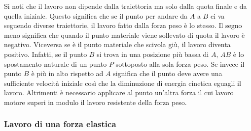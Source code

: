 \documentclass[10pt,a4paper]{book}
\begin{document}
\begin{figure}[htpb]
\end{figure}
\FloatBarrier
Si noti che il lavoro non dipende dalla traiettoria ma solo dalla quota finale e da quella iniziale. Questo significa che se il punto per andare da $A$ a $B$ ci va seguendo diverse traiettorie, il lavoro fatto dalla forza peso è lo stesso. Il segno meno significa che quando il punto materiale viene sollevato di quota il lavoro è negativo. Viceversa se è il punto materiale che scivola giù, il lavoro diventa positivo. Infatti, se il punto $B$ si trova in una posizione più bassa di $A$, $AB$ è lo spostamento naturale di un punto $P$ sottoposto alla sola forza peso. Se invece il punto $B$ è più in alto rispetto ad $A$ significa che il punto deve avere una sufficiente velocità iniziale così che la diminuzione di energia cinetica eguagli il lavoro. Altrimenti è necessario applicare al punto un'altra forza il cui lavoro motore superi in modulo il lavoro resistente della forza peso.

\subsubsection{Lavoro di una forza elastica}
\end{document}
